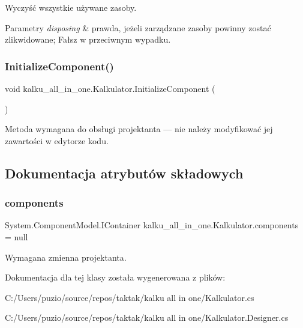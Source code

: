 Wyczyść wszystkie używane zasoby. 


\begin{DoxyParams}{Parametry}
{\em disposing} & prawda, jeżeli zarządzane zasoby powinny zostać zlikwidowane; Fałsz w przeciwnym wypadku.\\
\hline
\end{DoxyParams}
\mbox{\label{classkalku__all__in__one_1_1_kalkulator_a93058ddd473ac42a3bc101b648b0e3fe}} 
\subsubsection{\texorpdfstring{InitializeComponent()}{InitializeComponent()}}
{\footnotesize\ttfamily void kalku\+\_\+all\+\_\+in\+\_\+one.\+Kalkulator.\+Initialize\+Component (\begin{DoxyParamCaption}{ }\end{DoxyParamCaption})\hspace{0.3cm}{\ttfamily [private]}}



Metoda wymagana do obsługi projektanta — nie należy modyfikować jej zawartości w edytorze kodu. 



\subsection{Dokumentacja atrybutów składowych}
\mbox{\label{classkalku__all__in__one_1_1_kalkulator_a1715a33d70720ecdb66997bc7f5705ff}} 
\subsubsection{\texorpdfstring{components}{components}}
{\footnotesize\ttfamily System.\+Component\+Model.\+I\+Container kalku\+\_\+all\+\_\+in\+\_\+one.\+Kalkulator.\+components = null\hspace{0.3cm}{\ttfamily [private]}}



Wymagana zmienna projektanta. 



Dokumentacja dla tej klasy została wygenerowana z plików\+:\begin{DoxyCompactItemize}
\item 
C\+:/\+Users/puzio/source/repos/taktak/kalku all in one/Kalkulator.\+cs\item 
C\+:/\+Users/puzio/source/repos/taktak/kalku all in one/Kalkulator.\+Designer.\+cs\end{DoxyCompactItemize}

